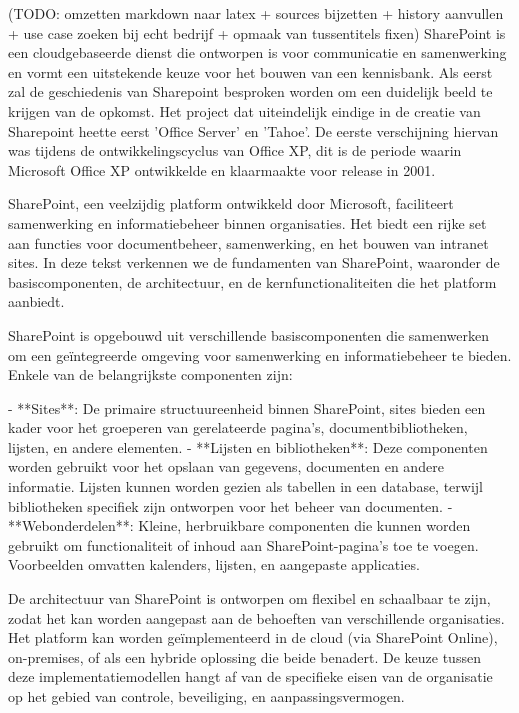 (TODO: omzetten markdown naar latex + sources bijzetten + history aanvullen + use case zoeken bij echt bedrijf + opmaak van tussentitels fixen)
SharePoint is een cloudgebaseerde dienst die ontworpen is voor communicatie en samenwerking en vormt een uitstekende keuze voor het bouwen van een kennisbank. Als eerst zal de geschiedenis van Sharepoint besproken worden om een duidelijk beeld te krijgen van de opkomst. Het project dat uiteindelijk eindige in de creatie van Sharepoint heette eerst 'Office Server' en 'Tahoe'. De eerste verschijning hiervan was tijdens de ontwikkelingscyclus van Office XP, dit is de periode waarin Microsoft Office XP ontwikkelde en klaarmaakte voor release in 2001. 

\subtitle{Sharepoint fundamenten} 
SharePoint, een veelzijdig platform ontwikkeld door Microsoft, faciliteert samenwerking en informatiebeheer binnen organisaties. Het biedt een rijke set aan functies voor documentbeheer, samenwerking, en het bouwen van intranet sites. In deze tekst verkennen we de fundamenten van SharePoint, waaronder de basiscomponenten, de architectuur, en de kernfunctionaliteiten die het platform aanbiedt.

\subtitle{Basiscomponenten van SharePoint}

SharePoint is opgebouwd uit verschillende basiscomponenten die samenwerken om een geïntegreerde omgeving voor samenwerking en informatiebeheer te bieden. Enkele van de belangrijkste componenten zijn:

- **Sites**: De primaire structuureenheid binnen SharePoint, sites bieden een kader voor het groeperen van gerelateerde pagina's, documentbibliotheken, lijsten, en andere elementen.
- **Lijsten en bibliotheken**: Deze componenten worden gebruikt voor het opslaan van gegevens, documenten en andere informatie. Lijsten kunnen worden gezien als tabellen in een database, terwijl bibliotheken specifiek zijn ontworpen voor het beheer van documenten.
- **Webonderdelen**: Kleine, herbruikbare componenten die kunnen worden gebruikt om functionaliteit of inhoud aan SharePoint-pagina's toe te voegen. Voorbeelden omvatten kalenders, lijsten, en aangepaste applicaties.

\subtitle{Architectuur}

De architectuur van SharePoint is ontworpen om flexibel en schaalbaar te zijn, zodat het kan worden aangepast aan de behoeften van verschillende organisaties. Het platform kan worden geïmplementeerd in de cloud (via SharePoint Online), on-premises, of als een hybride oplossing die beide benadert. De keuze tussen deze implementatiemodellen hangt af van de specifieke eisen van de organisatie op het gebied van controle, beveiliging, en aanpassingsvermogen.


